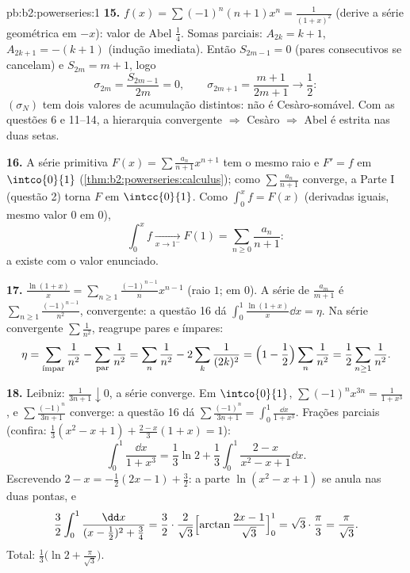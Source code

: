 \begin{solution}{pb:b2:powerseries:1}
\textbf{15.} $f(x) = \sum(-1)^n(n+1)x^n = \frac{1}{(1+x)^2}$
(derive a série geométrica em $-x$): valor de Abel
$\frac14$. Somas parciais: $A_{2k} = k+1$, $A_{2k+1} = -(k+1)$
(indução imediata). Então $S_{2m-1} = 0$ (pares consecutivos
se cancelam) e $S_{2m} = m + 1$, logo
\[
\sigma_{2m} = \frac{S_{2m-1}}{2m} = 0,
\qquad
\sigma_{2m+1} = \frac{m+1}{2m+1} \to \frac12 :
\]
$(\sigma_N)$ tem dois valores de acumulação distintos: não é
Cesàro-somável. Com as questões 6 e 11--14, a hierarquia
convergente $\Rightarrow$ Cesàro $\Rightarrow$ Abel é estrita
nas duas setas.

\textbf{16.} A série primitiva $F(x) =
\sum\frac{a_n}{n+1}x^{n+1}$ tem o mesmo raio e $F' = f$ em
$\intco{0}{1}$ (\cref{thm:b2:powerseries:calculus}); como
$\sum\frac{a_n}{n+1}$ converge, a Parte I (questão 2) torna $F$
 em $\intcc{0}{1}$. Como $\int_0^x f = F(x)$ (derivadas
iguais, mesmo valor $0$ em $0$),
\[
\int_0^x f \xrightarrow[x\to1^-]{} F(1)
= \sum_{n\geq0}\frac{a_n}{n+1} :
\]
a  existe com o valor enunciado.

\textbf{17.} $\frac{\ln(1+x)}{x} =
\sum_{n\geq1}\frac{(-1)^{n-1}}{n}x^{n-1}$ (raio $1$;
 em $0$). A série de $\frac{a_m}{m+1}$ é
$\sum_{n\geq1}\frac{(-1)^{n-1}}{n^2}$,  convergente:
a questão 16 dá $\int_0^1\frac{\ln(1+x)}{x}\dd x = \eta$. Na
série  convergente $\sum\frac1{n^2}$, reagrupe pares e
ímpares:
\[
\eta = \sum_{\text{ímpar}}\frac1{n^2} -
\sum_{\text{par}}\frac1{n^2}
= \sum_{n}\frac1{n^2} - 2\sum_{k}\frac1{(2k)^2}
= \Bigl(1 - \frac12\Bigr)\sum_n\frac1{n^2}
= \frac12\sum_{n\geq1}\frac1{n^2} .
\]

\textbf{18.} Leibniz: $\frac{1}{3n+1}\downarrow0$, a série
converge. Em $\intco{0}{1}$, $\sum(-1)^nx^{3n} =
\frac{1}{1+x^3}$, e $\sum\frac{(-1)^n}{3n+1}$ converge:
a questão 16 dá $\sum\frac{(-1)^n}{3n+1} =
\int_0^1\frac{\dd x}{1+x^3}$. Frações parciais (confira:
$\frac13(x^2-x+1) + \frac{2-x}{3}(1+x) = 1$):
\[
\int_0^1\frac{\dd x}{1+x^3}
= \frac13\ln2 + \frac13\int_0^1\frac{2-x}{x^2-x+1}\dd x .
\]
Escrevendo $2 - x = -\frac12(2x-1) + \frac32$: a parte $\ln(x^2-x+1)$
se anula nas duas pontas, e
\[
\frac32\int_0^1\frac{\dd x}{(x-\frac12)^2 + \frac34}
= \frac32\cdot\frac{2}{\sqrt3}
\Bigl[\arctan\frac{2x-1}{\sqrt3}\Bigr]_0^1
= \sqrt3\cdot\frac{\pi}{3} = \frac{\pi}{\sqrt3} .
\]
Total: $\frac13\bigl(\ln2 + \frac{\pi}{\sqrt3}\bigr)$.


\end{solution}
